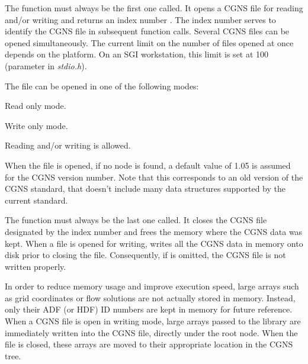 The function  must always be the first one called.
It opens a CGNS file for reading and/or writing and returns an index
number .
The index number serves to identify the CGNS file in subsequent
function calls.
Several CGNS files can be opened simultaneously.
The current limit on the number of files opened at once depends on the
platform.
On an SGI workstation, this limit is set at 100 (parameter
 in \textit{stdio.h}).

The file can be opened in one of the following modes:

\begin{Ventryic}{}
\item [\fort{MODE\_READ}]
      Read only mode.
\item [\fort{MODE\_WRITE}]
      Write only mode.
\item [\fort{MODE\_MODIFY}]
      Reading and/or writing is allowed.
\end{Ventryic}

When the file is opened, if no  node is
found, a default value of 1.05 is assumed for the CGNS version number.
Note that this corresponds to an old version of the CGNS standard, that
doesn't include many data structures supported by the current standard.

The function  must always be the last one called.
It closes the CGNS file designated by the index number  and frees
the memory where the CGNS data was kept.
When a file is opened for writing,  writes all the CGNS
data in memory onto disk prior to closing the file.
Consequently, if is omitted, the CGNS file is not written properly.

In order to reduce memory usage and improve execution speed,
large arrays such as grid coordinates or flow solutions are not actually
stored in memory.
Instead, only their ADF (or HDF) ID numbers are kept in memory for future
reference.
When a CGNS file is open in writing mode, large arrays passed to the
library are immediately written into the CGNS file, directly under the
root node.
When the file is closed, these arrays are moved to their appropriate
location in the CGNS tree.
